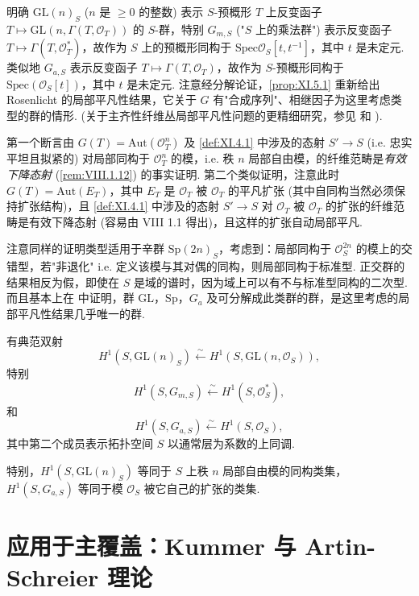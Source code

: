 明确 $\mathrm{GL}(n)_S$ ($n$ 是 $\geqslant 0$ 的整数) 表示 $S$-预概形 $T$ 上反变函子 $T \mapsto \mathrm{GL}(n, \Gamma(T, \mathcal{O}_T))$ 的 $S$-群，特别 $G_{m,S}$ ("$S$ 上的乘法群") 表示反变函子 $T \mapsto \Gamma(T, \mathcal{O}_T^{*})$，故作为 $S$ 上的预概形同构于 $\mathrm{Spec} \mathcal{O}_S[t, t^{-1}]$，其中 $t$ 是未定元. 类似地 $G_{a,S}$ 表示反变函子 $T \mapsto \Gamma(T, \mathcal{O}_T)$，故作为 $S$-预概形同构于 $\mathrm{Spec}(\mathcal{O}_S[t])$，其中 $t$ 是未定元. 注意经分解论证，\ref{prop:XI.5.1} 重新给出 Rosenlicht 的局部平凡性结果，它关于 $G$ 有"合成序列"、相继因子为这里考虑类型的群的情形. (关于主齐性纤维丛局部平凡性问题的更精细研究，参见 \cite{exp11-7} 和 \cite{exp11-3}).

第一个断言由 $G(T) = \mathrm{Aut}(\mathcal{O}_T^n)$ 及 \ref{def:XI.4.1} 中涉及的态射 $S' \to S$ (i.e. 忠实平坦且拟紧的) 对局部同构于 $\mathcal{O}_T^n$ 的模，i.e. 秩 $n$ 局部自由模，的纤维范畴是\emph{有效下降态射} (\cref{rem:VIII.1.12}) 的事实证明. 第二个类似证明，注意此时 $G(T) = \mathrm{Aut}(E_T)$，其中 $E_T$ 是 $\mathcal{O}_T$ 被 $\mathcal{O}_T$ 的平凡扩张 (其中自同构当然必须保持扩张结构)，且 \ref{def:XI.4.1} 中涉及的态射 $S' \to S$ 对 $\mathcal{O}_T$ 被 $\mathcal{O}_T$ 的扩张的纤维范畴是有效下降态射 (容易由 VIII 1.1 得出)，且这样的扩张自动局部平凡.

\begin{remark}\label{rem:XI.5.2}
注意同样的证明类型适用于辛群 $\mathrm{Sp}(2n)_S$，考虑到：局部同构于 $\mathcal{O}_S^{2n}$ 的模上的交错型，若"非退化" i.e. 定义该模与其对偶的同构，则局部同构于标准型. 正交群的结果相反为假，即使在 $S$ 是域的谱时，因为域上可以有不与标准型同构的二次型. 而且基本上在 \cite{exp11-3} 中证明，群 $\mathrm{GL}$，$\mathrm{Sp}$，$G_a$ 及可分解成此类群的群，是这里考虑的局部平凡性结果几乎唯一的群.
\end{remark}

\begin{corollary}\label{cor:XI.5.3}
有典范双射
\[
H^1(S, \mathrm{GL}(n)_S) \xleftarrow{\sim} H^1(S, \mathrm{GL}(n, \mathcal{O}_S)),
\]
特别
\[
H^1(S, G_{m,S}) \xleftarrow{\sim} H^1(S, \mathcal{O}_S^{*}),
\]
和
\[
H^1(S, G_{a,S}) \xleftarrow{\sim} H^1(S, \mathcal{O}_S),
\]
其中第二个成员表示拓扑空间 $S$ 以通常层为系数的上同调.
\end{corollary}

特别，$H^1(S, \mathrm{GL}(n)_S)$ 等同于 $S$ 上秩 $n$ 局部自由模的同构类集，$H^1(S, G_{a,S})$ 等同于模 $\mathcal{O}_S$ 被它自己的扩张的类集.

\section{应用于主覆盖：Kummer 与 Artin-Schreier 理论}


